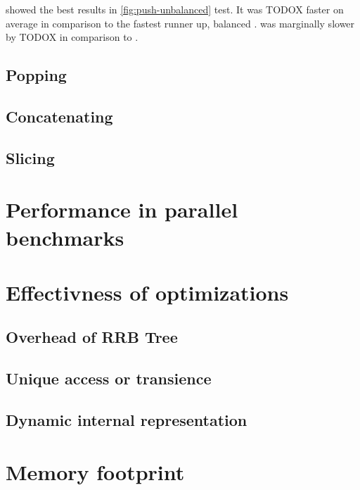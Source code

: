 \stdvec{} showed the best results in \ref{fig:push-unbalanced} test. It was TODOX faster on average in comparison to the fastest runner up, balanced \rrbvec{}. \imrsvec{} was marginally slower by TODOX in comparison to \pvec{}. 

\subsection{Popping}

\subsection{Concatenating}
\subsection{Slicing}

\section{Performance in parallel benchmarks}
\section{Effectivness of optimizations}
\subsection{Overhead of RRB Tree}
\subsection{Unique access or transience}
\subsection{Dynamic internal representation}
\section{Memory footprint}
